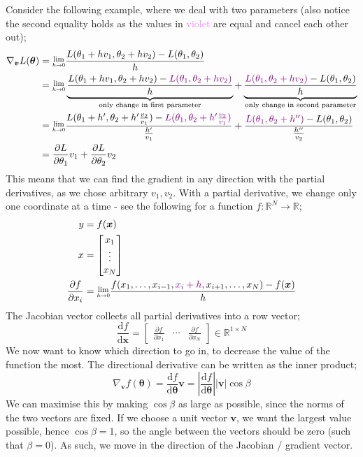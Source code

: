 \documentclass[a4paper, 12pt]{article}
\newcommand{\pdif}[2]{\frac{\partial #1}{\partial #2}}
\newcommand{\dif}[2]{\frac{\mathrm{d}#1}{\mathrm{d}#2}}
\newcommand{\limit}[2]{\raisebox{0.5ex}{\scalebox{0.8}{$\displaystyle{\lim_{#1 \to #2}}$}}}
\renewcommand{\vec}[1]{\boldsymbol{#1}}
\newcommand{\violet}[1]{\textcolor{violet}{#1}}
\begin{document}
            Consider the following example, where we deal with two parameters (also notice the second equality holds as the values in \violet{violet} are equal and cancel each other out);
            \begin{align*}
                \nabla_{\vec{v}}L(\vec{\theta}) & = \limit{h}{0}\frac{L(\theta_1 + hv_1, \theta_2 + hv_2) - L(\theta_1, \theta_2)}{h} \\
                & = \limit{h}{0}\underbrace{\frac{L(\theta_1 + hv_1, \theta_2 + hv_2) - \violet{L(\theta_1, \theta_2 + hv_2)}}{h}}_\text{only change in first parameter} + \underbrace{\frac{\violet{L(\theta_1, \theta_2 + hv_2)} - L(\theta_1, \theta_2)}{h}}_\text{only change in second parameter} \\
                & = \limit{h}{0}\frac{L(\theta_1 + h^\prime, \theta_2 + h^\prime\frac{v_2}{v_1}) - \violet{L(\theta_1, \theta_2 + h^\prime\frac{v_2}{v_1})}}{\frac{h^\prime}{v_1}} + \frac{\violet{L(\theta_1, \theta_2 + h^{\prime\prime})} - L(\theta_1, \theta_2)}{\frac{h^{\prime\prime}}{v_2}} \\
                & = \pdif{L}{\theta_1}v_1 + \pdif{L}{\theta_2}v_2
            \end{align*}
            This means that we can find the gradient in any direction with the partial derivatives, as we chose arbitrary $v_1, v_2$.
            With a partial derivative, we change only one coordinate at a time - see the following for a function $f : \mathbb{R}^N \to \mathbb{R}$;
            \begin{align*}
                y & = f(\vec{x}) \\
                x & = \begin{bmatrix}
                    x_1 \\ \vdots \\ x_N
                \end{bmatrix} \\
                \pdif{f}{x_i} & = \limit{h}{0} \frac{f(x_1, \dots, x_{i - 1}, \violet{x_i + h}, x_{i + 1}, \dots, x_N) - f(\vec{x})}{h}
            \end{align*}
            The Jacobian vector collects all partial derivatives into a row vector;
            $$\dif{f}{\vec{x}} = \begin{bmatrix}
                \pdif{f}{x_1} & \cdots & \pdif{f}{x_N}
            \end{bmatrix} \in \mathbb{R}^{1 \times N}$$
            We now want to know which direction to go in, to decrease the value of the function the most.
            The directional derivative can be written as the inner product;
            $$\nabla_{\vec{v}}f(\vec{\theta}) = \dif{f}{\vec{\theta}}\vec{v} = \left|\dif{f}{\vec{\theta}}\right|\left|\vec{v}\right| \cos \beta$$
            We can maximise this by making $\cos \beta$ as large as possible, since the norms of the two vectors are fixed.
            If we choose a unit vector $\vec{v}$, we want the largest value possible, hence $\cos \beta = 1$, so the angle between the vectors should be zero (such that $\beta = 0$).
            As such, we move in the direction of the Jacobian / gradient vector.
            \medskip
\end{document}
